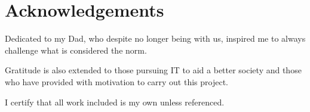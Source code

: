 \chapter*{Acknowledgements}

Dedicated to my Dad, who despite no longer being with us, inspired me to always challenge what is considered the norm.

Gratitude is also extended to those pursuing IT to aid a better society and those who have provided with motivation to carry out this project.

I certify that all work included is my own unless referenced.